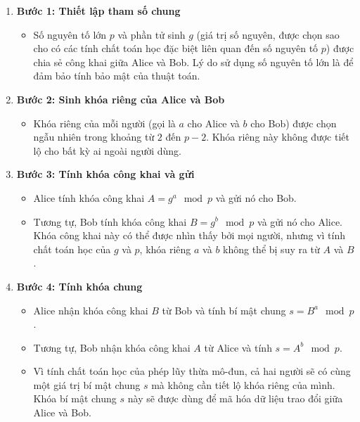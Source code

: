 \documentclass[a4paper,12pt]{article}
\begin{document}
\begin{enumerate}
    \item \textbf{Bước 1: Thiết lập tham số chung}
    \begin{itemize}
        \item Số nguyên tố lớn \( p \) và phần tử sinh \( g \) (giá trị số nguyên, được chọn sao cho có các tính chất toán học đặc biệt liên quan đến số nguyên tố \( p \)) được chia sẻ công khai giữa Alice và Bob. Lý do sử dụng số nguyên tố lớn là để đảm bảo tính bảo mật của thuật toán.
    \end{itemize}
    
    \item \textbf{Bước 2: Sinh khóa riêng của Alice và Bob}
    \begin{itemize}
        \item Khóa riêng của mỗi người (gọi là \( a \) cho Alice và \( b \) cho Bob) được chọn ngẫu nhiên trong khoảng từ \( 2 \) đến \( p-2 \). Khóa riêng này không được tiết lộ cho bất kỳ ai ngoài người dùng.
    \end{itemize}
    
    \item \textbf{Bước 3: Tính khóa công khai và gửi}
    \begin{itemize}
        \item Alice tính khóa công khai \( A = g^a \mod p \) và gửi nó cho Bob.
        \item Tương tự, Bob tính khóa công khai \( B = g^b \mod p \) và gửi nó cho Alice. Khóa công khai này có thể được nhìn thấy bởi mọi người, nhưng vì tính chất toán học của \( g \) và \( p \), khóa riêng \( a \) và \( b \) không thể bị suy ra từ \( A \) và \( B \).
    \end{itemize}
    
    \item \textbf{Bước 4: Tính khóa chung}
    \begin{itemize}
        \item Alice nhận khóa công khai \( B \) từ Bob và tính bí mật chung \( s = B^a \mod p \).
        \item Tương tự, Bob nhận khóa công khai \( A \) từ Alice và tính \( s = A^b \mod p \).
        \item Vì tính chất toán học của phép lũy thừa mô-đun, cả hai người sẽ có cùng một giá trị bí mật chung \( s \) mà không cần tiết lộ khóa riêng của mình. Khóa bí mật chung \( s \) này sẽ được dùng để mã hóa dữ liệu trao đổi giữa Alice và Bob.
    \end{itemize}
\end{enumerate}
\end{document}
